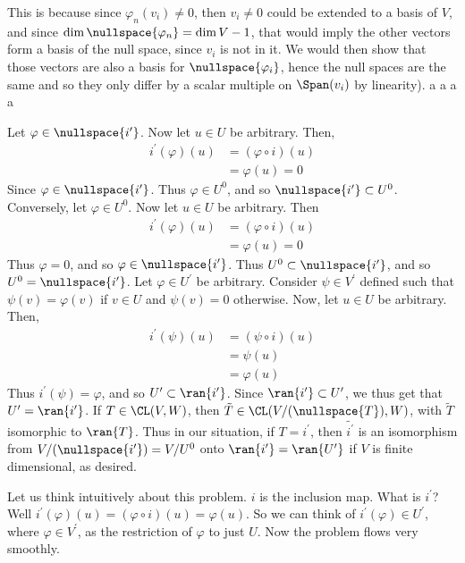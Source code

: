 \documentclass{book}
\begin{document}
\begin{enumerate}[label=\arabic*)]
      This is because since $\varphi_n(v_i) \neq 0$, then $v_i \neq 0$ could be extended to a basis of $V$, and since $\dim{\nullspace{\varphi_n}} = \dim{V} - 1$, that would imply the other
      vectors form a basis of the null space, since $v_i$ is not in it. We would then show that those vectors are also a basis for $\nullspace{\varphi_i}$, hence the null spaces are the same
      and so they only differ by a scalar multiple on $\Span(v_i)$ by linearity).
    \ii
    a
    \ii
    a
    \ii
    a
    \ii
    a
    \ii
      \begin{enumerate}[label=\alph*)]
        \ii 
          Let $\varphi \in \nullspace{i^{\prime}}$. Now let $u \in U$ be arbitrary. Then,
          \begin{align*}
            i^{\prime}(\varphi)(u) & = (\varphi \circ i)(u) \\
            & = \varphi(u) = 0
          \end{align*}
          Since $\varphi \in \nullspace{i^{\prime}}$. Thus $\varphi \in U^0$, and so $\nullspace{i^{\prime}} \subset U^0$. Conversely, let $\varphi \in U^0$. Now let $u \in U$ be arbitrary. Then
          \begin{align*}
            i^{\prime}(\varphi)(u) & = (\varphi \circ i)(u) \\
            & = \varphi(u) = 0
          \end{align*}
          Thus $\varphi = 0$, and so $\varphi \in \nullspace{i^{\prime}}$. Thus $U^0 \subset \nullspace{i^{\prime}}$, and so $U^0 = \nullspace{i^{\prime}}$.
        \ii 
          Let $\varphi \in U^{\prime}$ be arbitrary. Consider $\psi \in V^{\prime}$ defined such that $\psi(v) = \varphi(v)$ if $v \in U$ and $\psi(v) = 0$ otherwise. Now, let $u \in U$ be
          arbitrary. Then,
          \begin{align*}
            i^{\prime}(\psi)(u) & = (\psi \circ i)(u) \\
            & = \psi(u) \\
            & = \varphi(u)
          \end{align*}
          Thus $i^{\prime}(\psi) = \varphi$, and so $U^{\prime} \subset \ran{i^{\prime}}$. Since $\ran{i^{\prime}} \subset U^{\prime}$, we thus get that $U^{\prime} = \ran{i^{\prime}}$.
        \ii 
          If $T \in \CL(V, W)$, then $\tilde{T} \in \CL(V/(\nullspace{T}), W)$, with $\tilde{T}$ isomorphic to $\ran{T}$. Thus in our situation, if $T = i^{\prime}$, then $\tilde{i^{\prime}}$
          is an isomorphism from $V/(\nullspace{i^{\prime}}) = V/U^0$ onto $\ran{i^{\prime}} = \ran{U^{\prime}}$ if $V$ is finite dimensional, as desired.
      \end{enumerate}
      Let us think intuitively about this problem. $i$ is the inclusion map. What is $i^{\prime}$? Well $i^{\prime}(\varphi)(u) = (\varphi \circ i)(u) = \varphi(u)$. So we can think of
      $i^{\prime}(\varphi) \in U^{\prime}$, where $\varphi \in V^{\prime}$, as the restriction of $\varphi$ to just $U$. Now the problem flows very smoothly. 


\end{enumerate}
\end{document}
